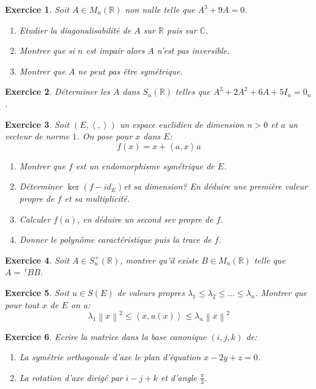 \documentclass[12pt,a4paper]{article}
\newcommand{\norme}[1]{\left\lVert#1\right\rVert}
\newcommand{\ps}[2]{\left\langle#1,#2\right\rangle}
\newcommand{\R}{\mathbb{R}}
\newcommand{\C}{\mathbb{C}}
\theoremstyle{break}
\newtheorem{Exo}{Exercice}
\begin{document}
\begin{Exo}
	Soit $A\in M_n(\R)$ non nulle telle que $A^3+9A=0$.
	\begin{enumerate}
		\item
		Etudier la diagonalisabilité de $A$ sur $\R$ puis sur $\C$.
		\item
		Montrer que si $n$ est impair alors $A$ n'est pas inversible.
		\item
		Montrer que $A$ ne peut pas être symétrique.
	\end{enumerate}
\end{Exo}

\begin{Exo}
	Déterminer les $A$ dans $S_n(\R)$ telles que $A^3+2A^2+6A+5I_n=0_n$.
\end{Exo}

\begin{Exo}
		Soit $(E,\ps{}{})$ un espace euclidien de dimension $n>0$ et $a$ un vecteur de norme $1$. On pose pour $x$ dans $E$:
	$$f(x)=x+\ps{a}{x}a$$
	\begin{enumerate}
		\item
		Montrer que $f$ est un endomorphisme  symétrique de $E$.
		\item
		Déterminer $\ker(f-id_E)$et sa dimension? En déduire une première valeur propre de $f$ et sa multiplicité.
		\item
		Calculer $f(a)$, en déduire un second sev propre de $f$.
		\item
		Donner le polynôme caractéristique puis la trace de $f$.
	\end{enumerate}
\end{Exo}

\begin{Exo}
	Soit $A\in S_n^+(\R)$, montrer qu'il existe $B\in M_n(\R)$ telle que $A=\ ^tBB$.
\end{Exo}

\begin{Exo}
	Soit $u\in S(E)$ de valeurs propres $\lambda_1\leqslant \lambda_2\leqslant \dots \leqslant \lambda_n$. Montrer que pour tout $x$ de $E$ on a:
	$$\lambda_1 \norme{x}^2\leqslant \ps{x}{u(x)}\leqslant \lambda_n\norme{x}^2$$
\end{Exo}

\begin{Exo}
	Ecrire la matrice dans la base canonique $(i,j,k)$ de:
	\begin{enumerate}
		\item
		La symétrie orthogonale d'axe le plan d'équation $x-2y+z=0$.
		\item
		La rotation d'axe dirigé par $i-j+k$ et d'angle $\frac{\pi}{3}$.
	\end{enumerate}
\end{Exo}
\end{document}
